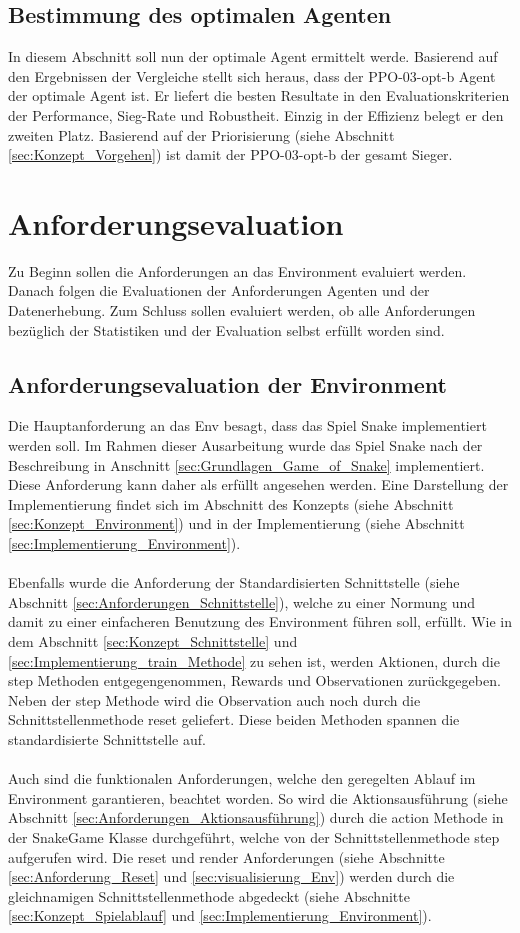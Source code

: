 \subsection{Bestimmung des optimalen Agenten}
In diesem Abschnitt soll  nun der optimale Agent ermittelt werde. Basierend auf den Ergebnissen der Vergleiche stellt sich heraus, dass der PPO-03-opt-b Agent der optimale Agent ist. Er liefert die besten Resultate in den Evaluationskriterien der Performance, Sieg-Rate und Robustheit. Einzig in der Effizienz belegt er den zweiten Platz. Basierend auf der Priorisierung (siehe Abschnitt \ref{sec:Konzept_Vorgehen}) ist damit der PPO-03-opt-b der gesamt Sieger.


\section{Anforderungsevaluation}
Zu Beginn sollen die Anforderungen an das Environment evaluiert werden. Danach folgen die Evaluationen der Anforderungen Agenten und der Datenerhebung. Zum Schluss sollen evaluiert werden, ob alle Anforderungen bezüglich der Statistiken und der Evaluation selbst erfüllt worden sind.

\subsection{Anforderungsevaluation der Environment}
Die Hauptanforderung an das Env besagt, dass das Spiel Snake implementiert werden soll. Im Rahmen dieser Ausarbeitung wurde das Spiel Snake nach der Beschreibung in Anschnitt \ref{sec:Grundlagen_Game_of_Snake} implementiert. Diese Anforderung kann daher als erfüllt angesehen werden. Eine Darstellung der Implementierung findet sich im Abschnitt des Konzepts (siehe Abschnitt \ref{sec:Konzept_Environment}) und in der Implementierung (siehe Abschnitt \ref{sec:Implementierung_Environment}).\\
\\ Ebenfalls wurde die Anforderung der Standardisierten Schnittstelle (siehe Abschnitt \ref{sec:Anforderungen_Schnittstelle}), welche zu einer Normung und damit zu einer einfacheren Benutzung des Environment führen soll, erfüllt. Wie in dem Abschnitt \ref{sec:Konzept_Schnittstelle} und \ref{sec:Implementierung_train_Methode} zu sehen ist, werden Aktionen, durch die step Methoden entgegengenommen, Rewards und Observationen zurückgegeben. Neben der step Methode wird die Observation auch noch durch die Schnittstellenmethode reset geliefert. Diese beiden Methoden spannen die standardisierte Schnittstelle auf.\\
\\ Auch sind die funktionalen Anforderungen, welche den geregelten Ablauf im Environment garantieren, beachtet worden.
So wird die Aktionsausführung (siehe Abschnitt \ref{sec:Anforderungen_Aktionsausführung}) durch die action Methode in der SnakeGame Klasse durchgeführt, welche von der Schnittstellenmethode step aufgerufen wird. Die reset und render Anforderungen (siehe Abschnitte \ref{sec:Anforderung_Reset} und \ref{sec:visualisierung_Env}) werden durch die gleichnamigen Schnittstellenmethode abgedeckt (siehe Abschnitte \ref{sec:Konzept_Spielablauf} und \ref{sec:Implementierung_Environment}).

